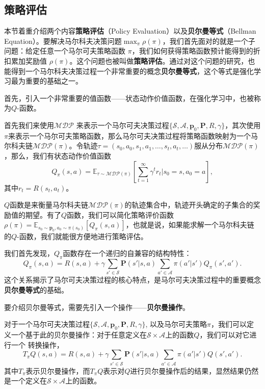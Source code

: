 \subsection{策略评估}

本节着重介绍两个内容\textbf{策略评估}（Policy Evaluation）以及\textbf{贝尔曼等式}（Bellman Equation）。要解决马尔科夫决策问题$\max_{\pi} \rho(\pi)$，我们首先面对的就是一个子问题：给定任意一个马尔可夫策略函数 $\pi$，我们如何获得策略函数预计能得到的折扣累加奖励值 $\rho(\pi)$。这个问题也被叫做\textbf{策略评估}。通过对这个问题的研究，也能得到一个马尔科夫决策过程一个非常重要的概念\textbf{贝尔曼等式}，这个等式是强化学习最为重要的基础之一。

首先，引入一个非常重要的值函数——状态动作价值函数，在强化学习中，也被称为$Q$-函数。
\begin{definition}
    首先我们来使用$\mathcal{MDP}$ 来表示一个马尔可夫决策过程$\{\mathcal{S}, \mathcal{A}, \mathbf{p}_0, \mathbf{P}, R, \gamma\}$，其次使用$\pi$来表示一个马尔可夫策略函数，那么马尔可夫决策过程将策略函数映射为一个马尔科夫链$\mathcal{MDP}(\pi)$。令轨迹$\tau = (s_0, a_0, s_1, a_1, \ldots, s_t, a_t, \ldots)$服从分布$\mathcal{MDP}(\pi)$，那么，我们有状态动作价值函数
    \begin{equation}
        Q_\pi(s, a) = \mathbb{E}_{\tau \sim \mathcal{MDP}(\pi)}
        \left[
        \sum^{\infty}_{t=1} \gamma^t r_t \bigg\vert s_0 = s, a_0 = a    
        \right],
    \end{equation}
    其中$r_t = R(s_t, a_t)$。
\end{definition}
$Q$函数是来衡量马尔科夫链$\mathcal{MDP}(\pi)$的轨迹集合中，轨迹开头确定的子集合的奖励值的期望。有了$Q$函数，我们可以简化策略评价函数$\rho(\pi) = \mathbb{E}_{s_0 \sim \mathbf{p}_0, a_0 \sim \pi(s_0)}[Q_\pi(s, a)]$，也就是说，如果能求解一个马尔科夫链的$Q$-函数，我们就能很方便地进行策略评估。

我们首先发现，$Q_\pi$函数存在一个递归的自兼容的结构特性：
\begin{equation}
    Q_\pi(s, a) = R(s, a) + \gamma \sum_{s'\in \mathcal{S}}\mathbf{P}(s' \vert s, a)
    \sum_{a' \in \mathcal{A}} \pi(a' \vert s') Q_\pi(s', a').
\end{equation}
这个关系揭示了马尔可夫决策过程的核心特点，是马尔可夫决策过程中的重要概念\textbf{贝尔曼等式}的基础。

要介绍贝尔曼等式，需要先引入一个操作——\textbf{贝尔曼操作}。
\begin{definition}
    对于一个马尔可夫决策过程$\{\mathcal{S}, \mathcal{A}, \mathbf{p}_0, \mathbf{P}, R, \gamma\}$, 以及马尔可夫策略$\pi$，我们可以定义一个基于此的贝尔曼操作：对于任意定义在$\mathcal{S} \times \mathcal{A}$上的函数$Q$，我们可以对它进行一个
    转换操作，
    \begin{equation}
        T_\pi Q(s, a) = R(s, a) + \gamma \sum_{s'\in \mathcal{S}}\mathbf{P}(s' \vert s, a)
        \sum_{a' \in \mathcal{A}} \pi(a' \vert s') Q(s', a').
    \end{equation}
    其中$T_\pi$表示贝尔曼操作，而$T_\pi Q$表示对$Q$进行贝尔曼操作后的结果，显然结果仍然是一个定义在$\mathcal{S}\times\mathcal{A}$上的函数。
\end{definition}

